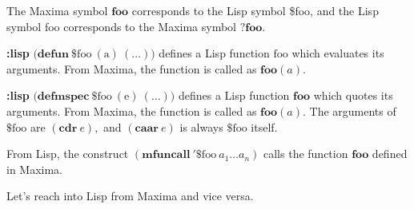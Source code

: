 \documentclass[12pt,leqno]{article}
\begin{document}
The Maxima symbol $\mathbf{foo}$ corresponds to the Lisp symbol \$foo,
and the Lisp symbol foo corresponds to the Maxima symbol $\mathbf{?foo}$.

{\bf :lisp} $\mathrm{(}\mathbf{defun\ } \mathrm{\$foo\ (a)\ (\ldots))}$
defines a Lisp function $\mathrm{foo}$ which evaluates its arguments.
From Maxima, the function is called as $\mathbf{foo}(a)$.

{\bf :lisp} $\mathrm{(}\mathbf{defmspec\ } \mathrm{\$foo\ (e)\ (\ldots))}$
defines a Lisp function $\mathbf{foo}$ which quotes its arguments.
From Maxima, the function is called as $\mathbf{foo}(a)$.
The arguments of $\mathrm{\$foo}$ are $(\mathbf{cdr\ } e),$
and $(\mathbf{caar\ } e)$ is always $\mathrm{\$foo}$ itself.

From Lisp, the construct $(\mathbf{mfuncall\ '\$}\mathrm{foo\ }a_1 \ldots a_n)$
calls the function $\mathbf{foo}$ defined in Maxima.

Let's reach into Lisp from Maxima and vice versa.
\end{document}
